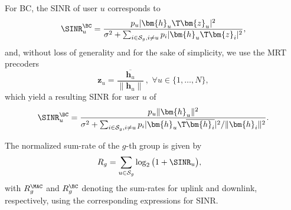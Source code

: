 For BC, the SINR of user $u$ corresponds to 
\begin{equation}
	\SINR_u^{\BC} = \frac{p_u|\bm{h}_u\T\bm{z}_u|^2}{\sigma^2+\sum_{i\in\mathcal{S}_{g},i\neq u}p_i|\bm{h}_u\T\bm{z}_i|^2},
	\label{usch:eqn:sinr_bc}
\end{equation}
and, without loss of generality and for the sake of simplicity, we use the MRT precoders \cite{Lo1999mrt}
\begin{equation}
	\bm{z}_u=\frac{\overline{\bm{h}_u}}{\|\bm{h}_u\|}\,,\,\,\forall u\in\{1,\ldots,N\},
\end{equation}
which yield a resulting SINR for user $u$ of
\begin{equation}
	\SINR_u^{\BC} = \frac{p_u\|\bm{h}_u\|^2}{\sigma^2+\sum_{i\in\mathcal{S}_{g},i\neq u}p_i|\bm{h}_u\T\overline{\bm{h}_i}|^2/\|\bm{h}_i\|^2}.\label{usch:eqn:sinr_bc_mrt}
\end{equation}

The normalized sum-rate of the $g$-th group is given by 
\begin{align}
	R_g&=\sum_{u\in\mathcal{S}_g}\log_2\big(1+\SINR_u\big),\label{usch:eqn:sum_rate}
\end{align}
with $R_g^{\MAC}$ and $R_g^{\BC}$ denoting the sum-rates for uplink and downlink, respectively, using the corresponding expressions for SINR. 


